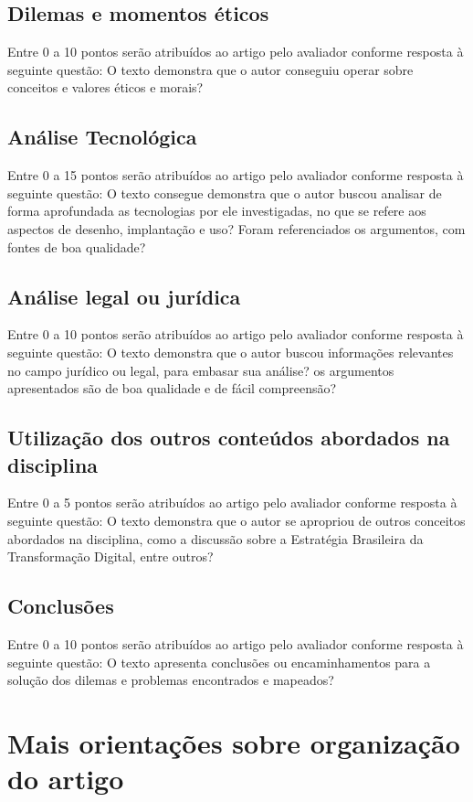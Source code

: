 \documentclass[12pt]{article}
\begin{document}
	\subsection{Dilemas e momentos éticos}
	Entre 0 a 10 pontos serão atribuídos ao artigo pelo avaliador conforme resposta à seguinte questão: O texto demonstra que o autor conseguiu operar sobre conceitos e valores éticos e morais?

	\subsection{Análise Tecnológica}
	Entre 0 a 15 pontos serão atribuídos ao artigo pelo avaliador conforme resposta à seguinte questão: O texto consegue demonstra que o autor buscou analisar de forma aprofundada as tecnologias por ele investigadas, no que se refere aos aspectos de desenho, implantação e uso? Foram referenciados os argumentos, com fontes de boa qualidade?

	\subsection{Análise legal ou jurídica}
	Entre 0 a 10 pontos serão atribuídos ao artigo pelo avaliador conforme resposta à seguinte questão: O texto demonstra que o autor buscou informações relevantes no campo jurídico ou legal, para embasar sua análise? os argumentos apresentados são de boa qualidade e de fácil compreensão?

	\subsection{Utilização dos outros conteúdos abordados na disciplina}
	Entre 0 a 5 pontos serão atribuídos ao artigo pelo avaliador conforme resposta à seguinte questão: O texto demonstra que o autor se apropriou de outros conceitos abordados na disciplina, como a discussão sobre a Estratégia Brasileira da Transformação Digital, entre outros?

	\subsection{Conclusões}
	Entre 0 a 10 pontos serão atribuídos ao artigo pelo avaliador conforme resposta à seguinte questão: O texto apresenta conclusões ou encaminhamentos para a solução dos dilemas e problemas encontrados e mapeados?

	\section{\label{mais:orientacoes}Mais orientações sobre organização do artigo}
\end{document}
